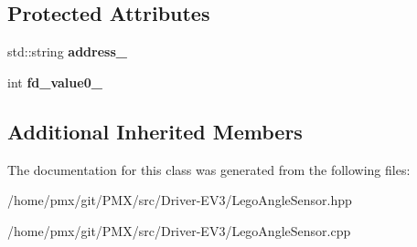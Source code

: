 \subsection*{Protected Attributes}
\begin{DoxyCompactItemize}
\item 
\mbox{\label{classLegoAngleSensor_a2fbbd2cdec96e79b298f396f3df6194b}} 
std\+::string {\bfseries address\+\_\+}
\item 
\mbox{\label{classLegoAngleSensor_aa678581bc7c09d6f5143448d17cb1a01}} 
int {\bfseries fd\+\_\+value0\+\_\+}
\end{DoxyCompactItemize}
\subsection*{Additional Inherited Members}


The documentation for this class was generated from the following files\+:\begin{DoxyCompactItemize}
\item 
/home/pmx/git/\+P\+M\+X/src/\+Driver-\/\+E\+V3/Lego\+Angle\+Sensor.\+hpp\item 
/home/pmx/git/\+P\+M\+X/src/\+Driver-\/\+E\+V3/Lego\+Angle\+Sensor.\+cpp\end{DoxyCompactItemize}
